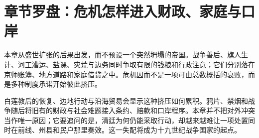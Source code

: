 \section{章节罗盘：危机怎样进入财政、家庭与口岸}
\label{sec:mid-qing-compass}

本章从盛世扩张的后果出发，而不预设一个突然坍塌的帝国。战争善后、旗人生计、河工漕运、盐课、灾荒与边务同时争取有限的钱粮和行政注意；它们分别落在京师账簿、地方道路和家庭借贷之中。危机因而不是一项可由总数概括的衰败，而是多种制度承诺开始彼此挤压。

白莲教后的恢复、边地行动与沿海贸易会显示这种挤压如何累积。鸦片、禁烟和战争随后将旧有的财政与社会难题接入条约、赔款和口岸程序。本章并不把对外冲突当作唯一原因；它要追问的是，清廷为何仍能采取行动，却越来越难让一项处置同时在前线、州县和民户那里奏效。这一失配将成为十九世纪战争国家的起点。
